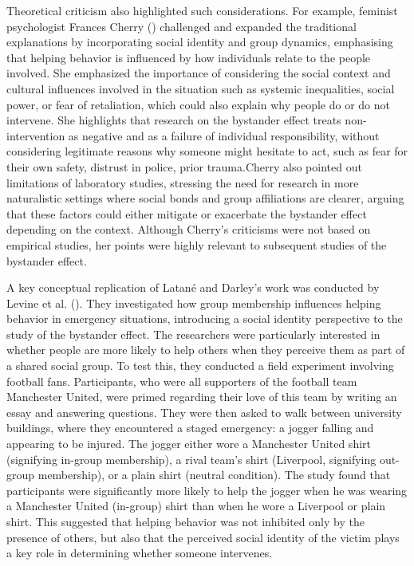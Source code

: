 \documentclass[
  letterpaper,
]{book}
\begin{document}
Theoretical criticism also highlighted such considerations. For example,
feminist psychologist Frances Cherry
() challenged and expanded the
traditional explanations by incorporating social identity and group
dynamics, emphasising that helping behavior is influenced by how
individuals relate to the people involved. She emphasized the importance
of considering the social context and cultural influences involved in
the situation such as systemic inequalities, social power, or fear of
retaliation, which could also explain why people do or do not intervene.
She highlights that research on the bystander effect treats
non-intervention as negative and as a failure of individual
responsibility, without considering legitimate reasons why someone might
hesitate to act, such as fear for their own safety, distrust in police,
prior trauma.Cherry also pointed out limitations of laboratory studies,
stressing the need for research in more naturalistic settings where
social bonds and group affiliations are clearer, arguing that these
factors could either mitigate or exacerbate the bystander effect
depending on the context. Although Cherry's criticisms were not based on
empirical studies, her points were highly relevant to subsequent studies
of the bystander effect.

A key conceptual replication of Latané and Darley's work was conducted
by Levine et al. (). They
investigated how group membership influences helping behavior in
emergency situations, introducing a social identity perspective to the
study of the bystander effect. The researchers were particularly
interested in whether people are more likely to help others when they
perceive them as part of a shared social group. To test this, they
conducted a field experiment involving football fans. Participants, who
were all supporters of the football team Manchester United, were primed
regarding their love of this team by writing an essay and answering
questions. They were then asked to walk between university buildings,
where they encountered a staged emergency: a jogger falling and
appearing to be injured. The jogger either wore a Manchester United
shirt (signifying in-group membership), a rival team's shirt (Liverpool,
signifying out-group membership), or a plain shirt (neutral condition).
The study found that participants were significantly more likely to help
the jogger when he was wearing a Manchester United (in-group) shirt than
when he wore a Liverpool or plain shirt. This suggested that helping
behavior was not inhibited only by the presence of others, but also that
the perceived social identity of the victim plays a key role in
determining whether someone intervenes.
\end{document}
